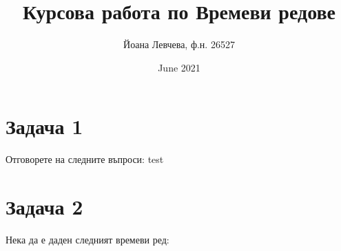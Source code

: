 \documentclass{article}
\title{Курсова работа по Времеви редове}
\author{Йоана Левчева, ф.н. 26527}
\date{June 2021}
\begin{document}
\maketitle

\section*{Задача 1}
Отговорете на следните въпроси:
    test

\section*{Задача 2}
Нека да е даден следният времеви ред:
\end{document}
